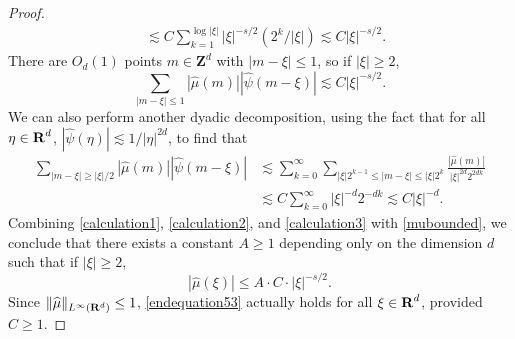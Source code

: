 \begin{proof}
\begin{equation}
\begin{split}
        &\lesssim C \sum_{k = 1}^{\log |\xi|} |\xi|^{-s/2} (2^k / |\xi| ) \lesssim C |\xi|^{-s/2}.
    \end{split}
    \end{equation}
    There are $O_d(1)$ points $m \in \mathbf{Z}^d$ with $|m - \xi| \leq 1$, so if $|\xi| \geq 2$,
    \begin{equation} \label{calculation2}
        \sum_{|m - \xi| \leq 1} |\widehat{\mu}(m)| |\widehat{\psi}(m - \xi)| \lesssim C |\xi|^{-s/2}.
    \end{equation}
    We can also perform another dyadic decomposition, using the fact that for all $\eta \in \operatorname{\mathbf{R}}^d$, $|\widehat{\psi}(\eta)| \lesssim 1/|\eta|^{2d}$, to find that
    \begin{equation} \label{calculation3}
    \begin{split}
        \sum_{|m - \xi| \geq |\xi|/2} |\widehat{\mu}(m)| |\widehat{\psi}(m - \xi)| &\lesssim \sum_{k = 0}^\infty \sum_{|\xi| 2^{k-1} \leq |m - \xi| \leq |\xi| 2^k} \frac{|\widehat{\mu}(m)|}{|\xi|^{2d} 2^{2dk}}\\
        &\lesssim C \sum_{k = 0}^\infty |\xi|^{-d} 2^{-dk} \lesssim C |\xi|^{-d}.
    \end{split}
    \end{equation}
    Combining \eqref{calculation1}, \eqref{calculation2}, and \eqref{calculation3} with \eqref{mubounded}, we conclude that there exists a constant $A \geq 1$ depending only on the dimension $d$ such that if $|\xi| \geq 2$,
    \begin{equation} \label{endequation53}
        |\widehat{\mu}(\xi)| \leq A \cdot C \cdot |\xi|^{-s/2}.
    \end{equation}
    Since $\| \widehat{\mu} \|_{L^\infty(\operatorname{\mathbf{R}}^d)} \leq 1$, \eqref{endequation53} actually holds for all $\xi \in \operatorname{\mathbf{R}}^d$, provided $C \geq 1$.
\end{proof}

